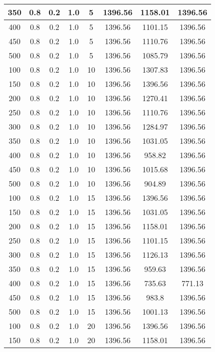 \documentclass[a4paper, 12pt]{extreport}
\begin{document}
\begin{itemize}
\begin{longtable}{|c|c|c|c|c|c|c|c|}
			350 & 0.8 & 0.2 & 1.0 & 5 & 1396.56 & 1158.01 & 1396.56 \\\hline
			400 & 0.8 & 0.2 & 1.0 & 5 & 1396.56 & 1101.15 & 1396.56 \\\hline
			450 & 0.8 & 0.2 & 1.0 & 5 & 1396.56 & 1110.76 & 1396.56 \\\hline
			500 & 0.8 & 0.2 & 1.0 & 5 & 1396.56 & 1085.79 & 1396.56 \\\hline
			100 & 0.8 & 0.2 & 1.0 & 10 & 1396.56 & 1307.83 & 1396.56 \\\hline
			150 & 0.8 & 0.2 & 1.0 & 10 & 1396.56 & 1396.56 & 1396.56 \\\hline
			200 & 0.8 & 0.2 & 1.0 & 10 & 1396.56 & 1270.41 & 1396.56 \\\hline
			250 & 0.8 & 0.2 & 1.0 & 10 & 1396.56 & 1110.76 & 1396.56 \\\hline
			300 & 0.8 & 0.2 & 1.0 & 10 & 1396.56 & 1284.97 & 1396.56 \\\hline
			350 & 0.8 & 0.2 & 1.0 & 10 & 1396.56 & 1031.05 & 1396.56 \\\hline
			400 & 0.8 & 0.2 & 1.0 & 10 & 1396.56 & 958.82 & 1396.56 \\\hline
			450 & 0.8 & 0.2 & 1.0 & 10 & 1396.56 & 1015.68 & 1396.56 \\\hline
			500 & 0.8 & 0.2 & 1.0 & 10 & 1396.56 & 904.89 & 1396.56 \\\hline
			100 & 0.8 & 0.2 & 1.0 & 15 & 1396.56 & 1396.56 & 1396.56 \\\hline
			150 & 0.8 & 0.2 & 1.0 & 15 & 1396.56 & 1031.05 & 1396.56 \\\hline
			200 & 0.8 & 0.2 & 1.0 & 15 & 1396.56 & 1158.01 & 1396.56 \\\hline
			250 & 0.8 & 0.2 & 1.0 & 15 & 1396.56 & 1101.15 & 1396.56 \\\hline
			300 & 0.8 & 0.2 & 1.0 & 15 & 1396.56 & 1126.13 & 1396.56 \\\hline
			350 & 0.8 & 0.2 & 1.0 & 15 & 1396.56 & 959.63 & 1396.56 \\\hline
			400 & 0.8 & 0.2 & 1.0 & 15 & 1396.56 & 735.63 & 771.13 \\\hline
			450 & 0.8 & 0.2 & 1.0 & 15 & 1396.56 & 983.8 & 1396.56 \\\hline
			500 & 0.8 & 0.2 & 1.0 & 15 & 1396.56 & 1001.13 & 1396.56 \\\hline
			100 & 0.8 & 0.2 & 1.0 & 20 & 1396.56 & 1396.56 & 1396.56 \\\hline
			150 & 0.8 & 0.2 & 1.0 & 20 & 1396.56 & 1158.01 & 1396.56 \\\hline

\end{longtable}
\end{itemize}
\end{document}
